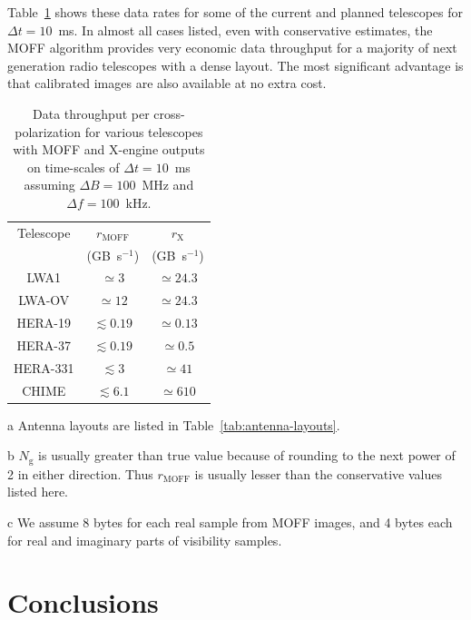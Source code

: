\documentclass[a4paper,fleqn,usenatbib]{mnras}
\newcommand{\Ngrid}{N_\textrm{g}}
\begin{document}
Table~\ref{tab:data-rates} shows these data rates for some of the current and 
planned telescopes for $\Delta t=10$~ms. In almost all cases listed, even with 
conservative estimates, the MOFF algorithm provides very economic data 
throughput for a majority of next generation radio telescopes with a dense 
layout. The most significant advantage is that calibrated images are also 
available at no extra cost.

\begin{table}
  \centering
  \caption{Data throughput per cross-polarization for various telescopes with 
    MOFF and X-engine outputs on time-scales of $\Delta t=10$~ms assuming 
    $\Delta B=100$~MHz and $\Delta f=100$~kHz.}
  \label{tab:data-rates}
  \begin{threeparttable}
  \begin{tabular}{ccc} 
    \hline
    Telescope\tnote{a} & $r_\textrm{MOFF}$\tnote{b} & $r_\textrm{X}$ \\
              & (GB~s$^{-1}$)\tnote{c} & (GB~s$^{-1}$)\tnote{c} \\
    \hline
    LWA1 & $\simeq 3$ & $\simeq 24.3$ \\
    LWA-OV & $\simeq 12$ & $\simeq 24.3$ \\
    HERA-19 & $\lesssim 0.19$ & $\simeq 0.13$ \\
    HERA-37 & $\lesssim 0.19$ & $\simeq 0.5$ \\
    HERA-331 & $\lesssim 3$ & $\simeq 41$ \\
    CHIME & $\lesssim 6.1$ & $\simeq 610$ \\
    \hline
  \end{tabular}
  \begin{tablenotes}
    \item[a] Antenna layouts are listed in Table~\ref{tab:antenna-layouts}.
    \item[b] $\Ngrid$ is usually greater than true value because of 
      rounding to the next power of 2 in either direction. Thus 
      $r_\textrm{MOFF}$ is usually lesser than the conservative values 
      listed here.
    \item[c] We assume 8 bytes for each real sample from MOFF images, and
      4 bytes each for real and imaginary parts of visibility samples.
  \end{tablenotes}
  \end{threeparttable}
\end{table}

\section{Conclusions}\label{sec:conclusions}
\end{document}
